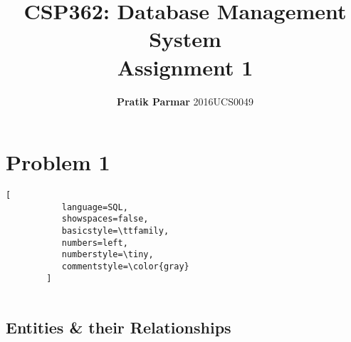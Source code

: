 \documentclass[12pt]{article}
\author{\textbf{Pratik Parmar} 2016UCS0049}
\date{}
\title{\textbf{CSP362: Database Management System\\ Assignment 1}}
\begin{document}
\maketitle
\newpage
\section*{Problem 1}
\begin{lstlisting}[
           language=SQL,
           showspaces=false,
           basicstyle=\ttfamily,
           numbers=left,
           numberstyle=\tiny,
           commentstyle=\color{gray}
        ]
        
\end{lstlisting}
\subsection*{Entities \& their Relationships}
\end{document}
